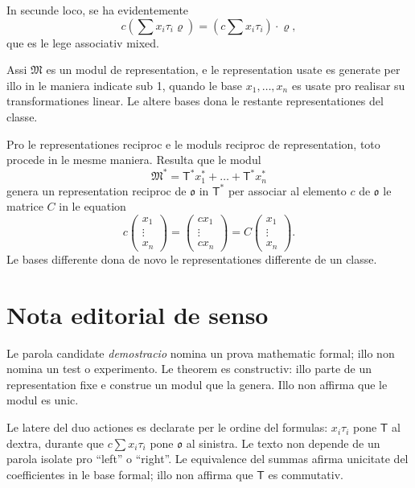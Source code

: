 \documentclass[11pt]{article}
\begin{document}
In secunde loco, se ha evidentemente
\[
c\left(\sum x_i\tau_i\varrho\right)
=\left(c\sum x_i\tau_i\right)\!\cdot\varrho,
\]
que es le lege associativ mixed.

Assi $\mathfrak M$ es un modul de representation, e le representation usate es generate per illo in le maniera indicate sub 1, quando le base $x_1,\ldots,x_n$ es usate pro realisar su transformationes linear. Le altere bases dona le restante representationes del classe.

Pro le representationes reciproc e le moduls reciproc de representation, toto procede in le mesme maniera. Resulta que le modul
\[
\mathfrak M^*=\mathsf T^*x_1^*+\dots+\mathsf T^*x_n^*
\]
genera un representation reciproc de $\mathfrak{o}$ in $\mathsf T^*$ per associar al elemento $c$ de $\mathfrak{o}$ le matrice $C$ in le equation
\[
c\begin{pmatrix}x_1\\ \vdots\\ x_n\end{pmatrix}
=\begin{pmatrix}cx_1\\ \vdots\\ cx_n\end{pmatrix}
=C\begin{pmatrix}x_1\\ \vdots\\ x_n\end{pmatrix}.
\]
Le bases differente dona de novo le representationes differente de un classe.

\clearpage
\vspace*{8mm}
\section*{Nota editorial de senso}

Le parola candidate \emph{demostracio} nomina un prova mathematic formal; illo non nomina un test o experimento. Le theorem es constructiv: illo parte de un representation fixe e construe un modul que la genera. Illo non affirma que le modul es unic.

Le latere del duo actiones es declarate per le ordine del formulas: $x_i\tau_i$ pone $\mathsf T$ al dextra, durante que $c\sum x_i\tau_i$ pone $\mathfrak{o}$ al sinistra. Le texto non depende de un parola isolate pro ``left'' o ``right''. Le equivalence del summas afirma unicitate del coefficientes in le base formal; illo non affirma que $\mathsf T$ es commutativ.
\end{document}
